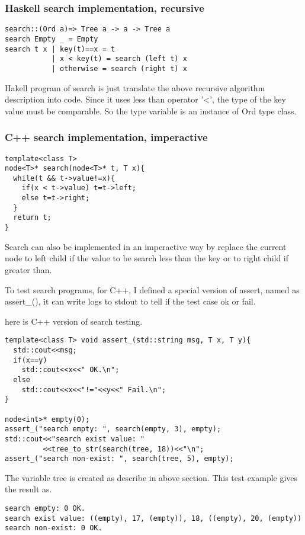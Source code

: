 \documentclass{article}
\begin{document}
\subsubsection*{Haskell search implementation, recursive}
\lstset{language=Haskell}
\begin{lstlisting}
search::(Ord a)=> Tree a -> a -> Tree a
search Empty _ = Empty
search t x | key(t)==x = t
           | x < key(t) = search (left t) x
           | otherwise = search (right t) x
\end{lstlisting}

Hakell program of search is just translate the above recursive algorithm
description into code. Since it uses less than operator '<', the type
of the key value must be comparable. So the type variable is an instance 
of Ord type class.

\subsubsection*{C++ search implementation, imperactive}
\lstset{language=C++}
\begin{lstlisting}
template<class T>
node<T>* search(node<T>* t, T x){
  while(t && t->value!=x){
    if(x < t->value) t=t->left;
    else t=t->right;
  }
  return t;
}
\end{lstlisting}

Search can also be implemented in an imperactive way by replace the current
node to left child if the value to be search less than the key or to right 
child if greater than.

To test search programs, for C++, I defined a special version of assert, named
as assert\_(), it can write logs to stdout to tell if the test case ok or fail.

here is C++ version of search testing.

\lstset{language=c++}
\begin{lstlisting}
template<class T> void assert_(std::string msg, T x, T y){
  std::cout<<msg;
  if(x==y)
    std::cout<<x<<" OK.\n";
  else
    std::cout<<x<<"!="<<y<<" Fail.\n";
}

node<int>* empty(0);
assert_("search empty: ", search(empty, 3), empty);
std::cout<<"search exist value: "
         <<tree_to_str(search(tree, 18))<<"\n";
assert_("search non-exist: ", search(tree, 5), empty);
\end{lstlisting}

The variable tree is created as describe in above section. This test example 
gives the result as.
\begin{verbatim}
search empty: 0 OK.
search exist value: ((empty), 17, (empty)), 18, ((empty), 20, (empty))
search non-exist: 0 OK.
\end{verbatim}
\end{document}
